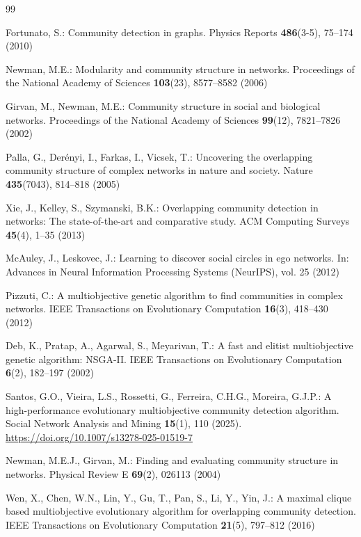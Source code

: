 \documentclass{svproc}
\begin{document}
{\scriptsize
\begin{thebibliography}{99}
\setlength{\itemsep}{-0.5pt}
\setlength{\parsep}{0pt}
\setlength{\parskip}{0pt}

Fortunato, S.: Community detection in graphs. Physics Reports \textbf{486}(3-5), 75--174 (2010)

Newman, M.E.: Modularity and community structure in networks. Proceedings of the National Academy of Sciences \textbf{103}(23), 8577--8582 (2006)

Girvan, M., Newman, M.E.: Community structure in social and biological networks. Proceedings of the National Academy of Sciences \textbf{99}(12), 7821--7826 (2002)

Palla, G., Der{\'e}nyi, I., Farkas, I., Vicsek, T.: Uncovering the overlapping community structure of complex networks in nature and society. Nature \textbf{435}(7043), 814--818 (2005)

Xie, J., Kelley, S., Szymanski, B.K.: Overlapping community detection in networks: The state-of-the-art and comparative study. ACM Computing Surveys \textbf{45}(4), 1--35 (2013)

McAuley, J., Leskovec, J.: Learning to discover social circles in ego networks. In: Advances in Neural Information Processing Systems (NeurIPS), vol. 25 (2012)

Pizzuti, C.: A multiobjective genetic algorithm to find communities in complex networks. IEEE Transactions on Evolutionary Computation \textbf{16}(3), 418--430 (2012)

Deb, K., Pratap, A., Agarwal, S., Meyarivan, T.: A fast and elitist multiobjective genetic algorithm: NSGA-II. IEEE Transactions on Evolutionary Computation \textbf{6}(2), 182--197 (2002)

Santos, G.O., Vieira, L.S., Rossetti, G., Ferreira, C.H.G., Moreira, G.J.P.: A high-performance evolutionary multiobjective community detection algorithm. Social Network Analysis and Mining \textbf{15}(1), 110 (2025). \url{https://doi.org/10.1007/s13278-025-01519-7}

Newman, M.E.J., Girvan, M.: Finding and evaluating community structure in networks. Physical Review E \textbf{69}(2), 026113 (2004)

Wen, X., Chen, W.N., Lin, Y., Gu, T., Pan, S., Li, Y., Yin, J.: A maximal clique based multiobjective evolutionary algorithm for overlapping community detection. IEEE Transactions on Evolutionary Computation \textbf{21}(5), 797--812 (2016)


\end{thebibliography}}
\end{document}
